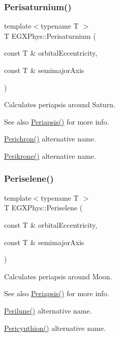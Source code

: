 \subsubsection{\texorpdfstring{Perisaturnium()}{Perisaturnium()}}
{\footnotesize\ttfamily template$<$typename T $>$ \\
T E\+G\+X\+Phys\+::\+Perisaturnium (\begin{DoxyParamCaption}\item[{const T \&}]{orbital\+Eccentricity,  }\item[{const T \&}]{semimajor\+Axis }\end{DoxyParamCaption})}



Calculates periapsis around Saturn. 

\begin{DoxySeeAlso}{See also}
\hyperlink{group___e_g_x_phys-_periapsis_ga4414ac75539371ec874a3d25cad6c9fe}{Periapsis()} for more info. 

\hyperlink{group___e_g_x_phys-_periapsis_ga12b5e99aa2e3e7031ef6ce93060cf516}{Perichron()} alternative name. 

\hyperlink{group___e_g_x_phys-_periapsis_gaa56f74c44a3583b8f0d13b821c1d7422}{Perikrone()} alternative name. 
\end{DoxySeeAlso}
\mbox{\label{group___e_g_x_phys-_periapsis_ga255874374dde571531e443cdbef9ef0c}} 
\subsubsection{\texorpdfstring{Periselene()}{Periselene()}}
{\footnotesize\ttfamily template$<$typename T $>$ \\
T E\+G\+X\+Phys\+::\+Periselene (\begin{DoxyParamCaption}\item[{const T \&}]{orbital\+Eccentricity,  }\item[{const T \&}]{semimajor\+Axis }\end{DoxyParamCaption})}



Calculates periapsis around Moon. 

\begin{DoxySeeAlso}{See also}
\hyperlink{group___e_g_x_phys-_periapsis_ga4414ac75539371ec874a3d25cad6c9fe}{Periapsis()} for more info. 

\hyperlink{group___e_g_x_phys-_periapsis_ga2cc7ab05e18d32c94d8d74972e032793}{Perilune()} alternative name. 

\hyperlink{group___e_g_x_phys-_periapsis_gaeeba153b188cd06cbd233eaef12f0a6a}{Pericynthion()} alternative name. 
\end{DoxySeeAlso}
\mbox{\label{group___e_g_x_phys-_periapsis_gab8b8131a617dd2d2a4de1d48accd7442}} 
